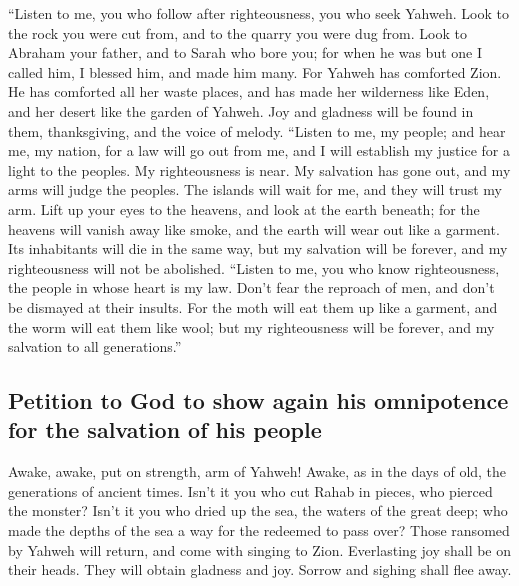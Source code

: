 \begin{paracol}{2}
\begin{otherlanguage}{english}
 ``Listen to me, you who follow after righteousness, you
who seek Yahweh. Look to the rock you were cut from, and to the quarry
you were dug from.  Look to Abraham your father, and to
Sarah who bore you; for when he was but one I called him, I blessed him,
and made him many.  For Yahweh has comforted Zion. He has
comforted all her waste places, and has made her wilderness like Eden,
and her desert like the garden of Yahweh. Joy and gladness will be found
in them, thanksgiving, and the voice of melody.  ``Listen
to me, my people; and hear me, my nation, for a law will go out from me,
and I will establish my justice for a light to the peoples.
 My righteousness is near. My salvation has gone out, and
my arms will judge the peoples. The islands will wait for me, and they
will trust my arm.  Lift up your eyes to the heavens, and
look at the earth beneath; for the heavens will vanish away like smoke,
and the earth will wear out like a garment. Its inhabitants will die in
the same way, but my salvation will be forever, and my righteousness
will not be abolished.  ``Listen to me, you who know
righteousness, the people in whose heart is my law. Don't fear the
reproach of men, and don't be dismayed at their insults. 
For the moth will eat them up like a garment, and the worm will eat them
like wool; but my righteousness will be forever, and my salvation to all
generations.''

\hypertarget{petition-to-god-to-show-again-his-omnipotence-for-the-salvation-of-his-people}{%
\subsection{Petition to God to show again his omnipotence for the
salvation of his
people}\label{petition-to-god-to-show-again-his-omnipotence-for-the-salvation-of-his-people}}

 Awake, awake, put on strength, arm of Yahweh! Awake, as
in the days of old, the generations of ancient times. Isn't it you who
cut Rahab in pieces, who pierced the monster?  Isn't it
you who dried up the sea, the waters of the great deep; who made the
depths of the sea a way for the redeemed to pass over? 
Those ransomed by Yahweh will return, and come with singing to Zion.
Everlasting joy shall be on their heads. They will obtain gladness and
joy. Sorrow and sighing shall flee away.

\hypertarget{new-consolation-and-encouragement-of-the-people-by-god}{%
}
\end{otherlanguage}
\end{paracol}

